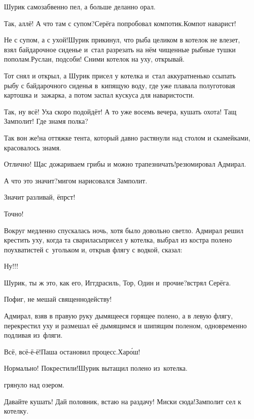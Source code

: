 \noindent Шурик самозабвенно пел, а больше деланно орал.

\diagdash Так, аллё! А что там с супом?\mdash Серёга попробовал компотик.\mdash Компот наварист!

\diagdash Не с супом, а с ухой!\mdash Шурик прикинул, что рыба целиком в котелок не влезет, взял байдарочное сиденье и~стал разрезать на нём чищенные рыбные тушки пополам.\mdash Руслан, подсоби! Сними котелок на уху, открывай.

Тот снял и открыл, а Шурик присел у котелка и~стал аккуратненько ссыпать рыбу с байдарочного сиденья в~кипящую воду, где уже плавала полуготовая картошка и~зажарка, а потом заспал кус\sdash куса для наваристости.

\diagdash Так, ну всё! Уха скоро подойдёт! А то уже восемь вечера, кушать охота! Тащ Замполит! Где знамя полка? 

\diagdash Так вон же!\mdash на оттяжке тента, который давно растянули над столом и скамейками, красовалось знамя.

\diagdash Отлично! Щас дожариваем грибы и можно трапезничать!\mdash резюмировал Адмирал.

\diagdash А что это значит?\mdash мигом нарисовался Замполит.

\diagdash Значит разливай, ёпрст!

\diagdash Точно!

Вокруг медленно спускалась ночь, хотя было довольно светло. Адмирал решил крестить уху, когда та сварилась\mdash присел у котелка, выбрал из костра полено поухватистей с~угольком и, открыв флягу с водкой, сказал:

\diagdash Ну!!!

\diagdash Шурик, ты ж это, как его, Иггдрасиль, Тор, Один и~прочие?\mdash встрял Серёга.

\diagdash Пофиг, не мешай священнодейству!

Адмирал, взяв в правую руку дымящееся горящее полено, а в левую флягу, перекрестил уху и размешал её дымящимся и шипящим поленом, одновременно подливая из~фляги.

\diagdash Всё, всё-ё-ё!\mdash Паша остановил процесс.\mdash Хар{\'о}ш!

\diagdash Нормально! Покрестили!\mdash Шурик вытащил полено из~котелка.

\mdash грянуло над озером.

\diagdash Давайте кушать! Дай половник, встаю на раздачу! Миски сюда!\mdash Замполит сел к котелку.

